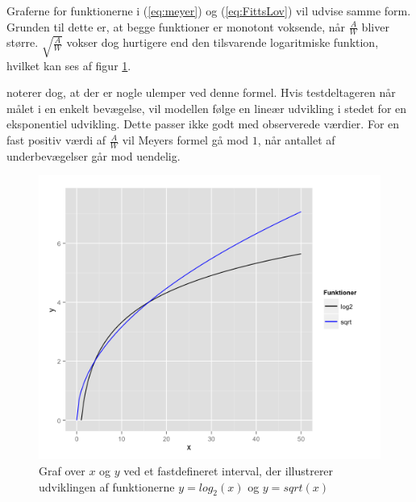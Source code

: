 Graferne for funktionerne i (\ref{eq:meyer}) og (\ref{eq:FittsLov}) vil udvise samme form. Grunden til dette er, at begge funktioner er monotont voksende, når $\frac{A}{W}$ bliver større. $\sqrt{\frac{A}{W}}$ vokser dog hurtigere end den tilsvarende logaritmiske funktion, hvilket kan ses af figur \ref{fig:log_vs_sqrt}. 

\cite{goldberg2015} noterer dog, at der er nogle ulemper ved denne formel. Hvis testdeltageren når målet i en enkelt bevægelse, vil modellen følge en lineær udvikling i stedet for en eksponentiel udvikling. Dette passer ikke godt med observerede værdier. For en fast positiv værdi af $\frac{A}{W}$ vil Meyers formel gå mod $1$, når antallet af underbevægelser går mod uendelig.

\begin{figure}[h]
\centering
\includegraphics[width=.7\linewidth]{images/illustrations/meyer_plot_comparison}
\caption{Graf over $x$ og $y$ ved et fastdefineret interval, der illustrerer udviklingen af funktionerne $y=log_2(x)$ og $y=sqrt(x)$}
\label{fig:log_vs_sqrt}
\end{figure}

\newpage
{}
